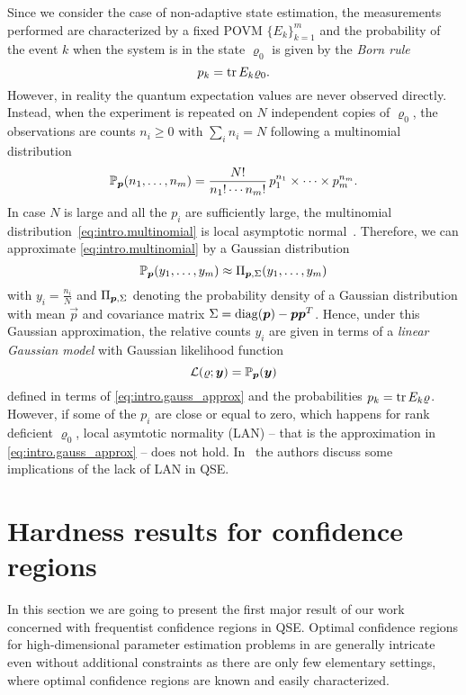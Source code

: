 Since we consider the case of non-adaptive state estimation, the measurements performed are characterized by a fixed POVM $\{E_k\}_{k=1}^m$ and the probability of the event $k$ when the system is in the state $\varrho_0$ is given by the \emph{Born rule}
\[
  p_k = \operatorname{tr} E_k \varrho_0.
\]
However, in reality the quantum expectation values are never observed directly.
Instead, when the experiment is repeated on $N$ independent copies of $\varrho_0$, the observations are counts $n_i \ge 0$ with $\sum_i n_i = N$
following a multinomial distribution
\[
  \label{eq:intro.multinomial}
  \mathbb{P}_{{\boldsymbol{p}}}(n_1, \ldots, n_m) = \frac{N!}{n_1! \cdots n_m!} \, p_1^{n_1} \times \cdots \times p_m^{n_m}.
\]
In case $N$ is large and all the $p_i$ are sufficiently large, the multinomial distribution~\eqref{eq:intro.multinomial} is local asymptotic normal~\cite{Severini_2005_Elements}.
Therefore, we can approximate \cref{eq:intro.multinomial} by a Gaussian distribution
\[
  \label{eq:intro.gauss_approx}
  \mathbb{P}_{{\boldsymbol{p}}}(y_1, \ldots, y_m) \approx \Pi_{{\boldsymbol{p}}, \Sigma}(y_1, \ldots, y_m)
\]
with $y_i = \frac{n_i}{N}$ and $\Pi_{{\boldsymbol{p}}, \Sigma}$ denoting the probability density of a Gaussian distribution with mean $\vec p$ and covariance matrix $\Sigma = \mathrm{diag}({\boldsymbol{p}}) - {\boldsymbol{p}} {\boldsymbol{p}}^T$.
Hence, under this Gaussian approximation, the relative counts $y_i$ are given in terms of a \emph{linear Gaussian model} with Gaussian likelihood function
\[
  \label{eq:intro.gauss_likelihood}
  \mathcal{L}(\varrho; {\boldsymbol{y}}) = \mathbb{P}_{{\boldsymbol{p}}}({\boldsymbol{y}})
\]
defined in terms of \cref{eq:intro.gauss_approx} and the probabilities $p_k = \operatorname{tr} E_k \varrho$.
However, if some of the $p_{i}$ are close or equal to zero, which happens for rank deficient $\varrho_{0}$, local asymtotic normality (LAN) -- that is the approximation in \cref{eq:intro.gauss_approx} -- does not hold.
In~\cite{Scholten_2016_Behavior} the authors discuss some implications of the lack of LAN in QSE.


\section{Hardness results for confidence regions}
\label{sec:error.ortho}

In this section we are going to present the first major result of our work~\cite{Suess_2016_Error} concerned with frequentist confidence regions in QSE.
Optimal confidence regions for high-dimensional parameter estimation problems in are generally intricate even without additional constraints as there are only few elementary settings, where optimal confidence regions are known and easily characterized.

